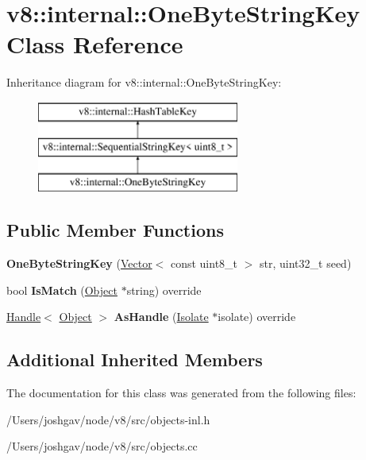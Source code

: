 \hypertarget{classv8_1_1internal_1_1_one_byte_string_key}{}\section{v8\+:\+:internal\+:\+:One\+Byte\+String\+Key Class Reference}
\label{classv8_1_1internal_1_1_one_byte_string_key}
Inheritance diagram for v8\+:\+:internal\+:\+:One\+Byte\+String\+Key\+:\begin{figure}[H]
\begin{center}
\leavevmode
\includegraphics[height=3.000000cm]{classv8_1_1internal_1_1_one_byte_string_key}
\end{center}
\end{figure}
\subsection*{Public Member Functions}
\begin{DoxyCompactItemize}
\item 
{\bfseries One\+Byte\+String\+Key} (\hyperlink{classv8_1_1internal_1_1_vector}{Vector}$<$ const uint8\+\_\+t $>$ str, uint32\+\_\+t seed)\hypertarget{classv8_1_1internal_1_1_one_byte_string_key_af497a4add2f39394c97aa60b9d98c1be}{}\label{classv8_1_1internal_1_1_one_byte_string_key_af497a4add2f39394c97aa60b9d98c1be}

\item 
bool {\bfseries Is\+Match} (\hyperlink{classv8_1_1internal_1_1_object}{Object} $\ast$string) override\hypertarget{classv8_1_1internal_1_1_one_byte_string_key_a04cb42e14aafe8d0545b23a8a4689688}{}\label{classv8_1_1internal_1_1_one_byte_string_key_a04cb42e14aafe8d0545b23a8a4689688}

\item 
\hyperlink{classv8_1_1internal_1_1_handle}{Handle}$<$ \hyperlink{classv8_1_1internal_1_1_object}{Object} $>$ {\bfseries As\+Handle} (\hyperlink{classv8_1_1internal_1_1_isolate}{Isolate} $\ast$isolate) override\hypertarget{classv8_1_1internal_1_1_one_byte_string_key_acdc1377792fba4f57e7f3685c7b45017}{}\label{classv8_1_1internal_1_1_one_byte_string_key_acdc1377792fba4f57e7f3685c7b45017}

\end{DoxyCompactItemize}
\subsection*{Additional Inherited Members}


The documentation for this class was generated from the following files\+:\begin{DoxyCompactItemize}
\item 
/\+Users/joshgav/node/v8/src/objects-\/inl.\+h\item 
/\+Users/joshgav/node/v8/src/objects.\+cc\end{DoxyCompactItemize}
